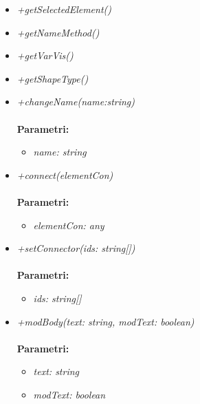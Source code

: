 \begin{itemize}
\begin{itemize}
    		\item \emph{+getSelectedElement()}\\
    		
    		\item \emph{+getNameMethod()}\\
    		
    		\item \emph{+getVarVis()}\\
    		
    		\item \emph{+getShapeType()}\\
    		
    		\item \emph{+changeName(name:string)}\\
    		\\
    		\textbf{Parametri:}
    		\begin{itemize}
    			\item \emph{name: string}\\
    			
    		\end{itemize}
    		\item \emph{+connect(elementCon)}\\
    		\\
    		\textbf{Parametri:}
    		\begin{itemize}
    			\item \emph{elementCon: any}\\
    			
    		\end{itemize}
    		\item \emph{+setConnector(ids: string[])}\\
    		\\
    		\textbf{Parametri:}
    		\begin{itemize}
    			\item \emph{ids: string[]}\\
    			
    		\end{itemize}
    		\item \emph{+modBody(text: string, modText: boolean)}\\
    		\\
    		\textbf{Parametri:}
    		\begin{itemize}
    			\item \emph{text: string}\\
    			
    			\item \emph{modText: boolean}\\
    			

\end{itemize}
\end{itemize}
\end{itemize}

